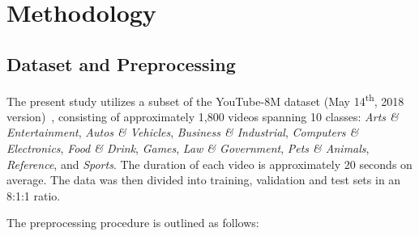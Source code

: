 
\section{Methodology}

\subsection{Dataset and Preprocessing}



The present study utilizes a subset of the YouTube-8M dataset (May 14\textsuperscript{th}, 2018 version)~\cite{abu2016youtube}, consisting of approximately 1,800 videos spanning 10 classes: \textit{Arts \& Entertainment}, \textit{Autos \& Vehicles}, \textit{Business \& Industrial}, \textit{Computers \& Electronics}, \textit{Food \& Drink}, \textit{Games}, \textit{Law \& Government}, \textit{Pets \& Animals}, \textit{Reference}, and \textit{Sports}.
The duration of each video is approximately 20 seconds on average.
The data was then divided into training, validation and test sets in an 8:1:1 ratio.

The preprocessing procedure is outlined as follows:

